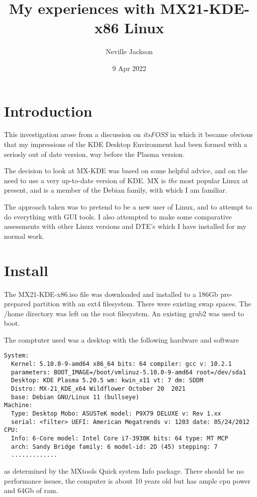 \documentclass{article}  %
\title{My experiences with MX21-KDE-x86 Linux}
\author{Neville Jackson}
\date{9 Apr 2022}
\begin{document}
 

\maketitle      

\section{Introduction} 
This investigation arose from a discussion on {\em itsFOSS} in which it became obvious that my impressions of the KDE Desktop Environment had been formed with a seriosly out of date version, way before the Plasma version. 

The decision to look at MX-KDE was based on some helpful advice, and on the need to use a very up-to-date version of KDE. MX is {\em the} most popular Linux at present, and is a member of the Debian family, with which I am familiar.

The approach taken was to pretend to be a new user of Linux, and to attempt to do everything with GUI tools. 
I also attempted to make some comparative assessments with other Linux versions and DTE's which I have installed for my normal work.

\section{Install}
\label{sec:install}
The MX21-KDE-x86.iso file was downloaded and installed to a 186Gb pre-prepared partition with an ext4 filesystem. There were existing swap spaces. The /home directory was left on the root filesystem. An existing grub2 was used to boot.

The comptuter used  was a desktop with the following hardware and software
\begin{verbatim}
System:
  Kernel: 5.10.0-9-amd64 x86_64 bits: 64 compiler: gcc v: 10.2.1 
  parameters: BOOT_IMAGE=/boot/vmlinuz-5.10.0-9-amd64 root=/dev/sda1 
  Desktop: KDE Plasma 5.20.5 wm: kwin_x11 vt: 7 dm: SDDM 
  Distro: MX-21_KDE_x64 Wildflower October 20  2021 
  base: Debian GNU/Linux 11 (bullseye) 
Machine:
  Type: Desktop Mobo: ASUSTeK model: P9X79 DELUXE v: Rev 1.xx 
  serial: <filter> UEFI: American Megatrends v: 1203 date: 05/24/2012 
CPU:
  Info: 6-Core model: Intel Core i7-3930K bits: 64 type: MT MCP 
  arch: Sandy Bridge family: 6 model-id: 2D (45) stepping: 7 
  .............
\end{verbatim}
as determined by the MXtools Quick system Info package. 
There should be no performance issues, the computer is about 10 years old but has ample cpu power and 64Gb of ram.
\end{document}
